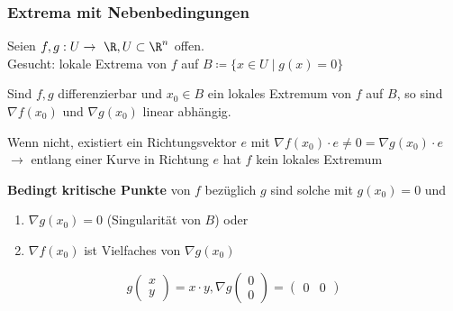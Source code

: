 \subsubsection{Extrema mit Nebenbedingungen}
Seien $f , g : U \rightarrow \R , U \subset \R^n$ offen. \\
Gesucht: lokale Extrema von $f$ auf $B \coloneqq \{ x \in U \mid g(x) = 0 \}$
\begin{satz*}
	Sind $f , g$ differenzierbar und $x_0 \in B$ ein lokales Extremum von $f$ auf $B$, so sind $\nabla f(x_0)$ und $\nabla g(x_0)$ linear abhängig.
	\begin{bew}[head = Beweisidee]
		Wenn nicht, existiert ein Richtungsvektor $e$ mit $\nabla f(x_0) \cdot e \neq 0 = \nabla g(x_0) \cdot e$ \\
		$\rightarrow$ entlang einer Kurve in Richtung $e$ hat $f$ kein lokales Extremum
	\end{bew}
\end{satz*}
\begin{def*}[note = Bedingt kritischer Punkt , index = bedingt kritischer Punkt , indexformat = {23!1~}]
	\textbf{Bedingt kritische Punkte} von $f$ bezüglich $g$ sind solche mit $g(x_0) = 0$ und
	\begin{enumerate}[label = (\alph*)]
		\item $\nabla g(x_0) = 0$ (Singularität von $B$) oder
		\item $\nabla f(x_0)$ ist Vielfaches von $\nabla g(x_0)$
	\end{enumerate}
\end{def*}
\begin{bsp*}
	\[ g\begin{pmatrix} x \\ y \end{pmatrix} = x \cdot y , \nabla g\begin{pmatrix} 0 \\ 0 \end{pmatrix} = \begin{pmatrix} 0 &0 \end{pmatrix} \]
\end{bsp*}
